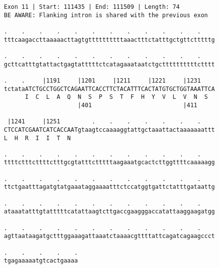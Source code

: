\documentclass{article}
\begin{document}
\begin{Verbatim}
Exon 11 | Start: 111435 | End: 111509 | Length: 74
BE AWARE: Flanking intron is shared with the previous exon
 
.    .    .    .    .    .    .    .    .    .    .    .    
tttcaagaccttaaaaacttagtgttttttttttaaactttctatttgctgttctttttg
  
.    .    .    .    .    .    .    .    .    .    .    .    
gcttcatttgtattactgagtatttttctcatagaaataatctgcttttttttttctttt
  
.    .     |1191     |1201     |1211     |1221     |1231    
tctataATCTGCCTGGCTCAGAATTCACCTTCTACATTTCACTATGTGCTGGTAAATTCA
      I  C  L  A  Q  N  S  P  S  T  F  H  Y  V  L  V  N  S  
                     |401                          |411     
  
 |1241     |1251         .    .    .    .    .    .    .    
CTCCATCGAATCATCACCAATgtaagtccaaaaggtattgctaaattactaaaaaaattt
L  H  R  I  I  T  N                                         
  
.    .    .    .    .    .    .    .    .    .    .    .    
ttttctttcttttctttgcgtatttctttttaagaaatgcactcttggttttcaaaaagg
  
.    .    .    .    .    .    .    .    .    .    .    .    
ttctgaatttagatgtatgaaataggaaaatttctccatggtgattctatttgataattg
  
.    .    .    .    .    .    .    .    .    .    .    .    
ataaatatttgtatttttcatattaagtcttgaccgaagggaccatattaaggaagatgg
  
.    .    .    .    .    .    .    .    .    .    .    .    
agttaataagatgctttggaaagattaaatctaaaacgttttattcagatcagaagccct
  
.    .    .    .    .
tgagaaaaatgtcactgaaaa
\end{Verbatim}
\newpage
\end{document}
